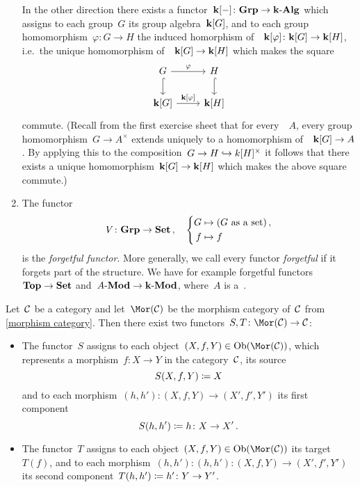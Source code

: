 \begin{example}
\begin{enumerate}
      In the other direction there exists a functor~$\mathbf{k}[-] \colon \mathbf{Grp} \to \text{$\mathbf{k}$-$\mathbf{Alg}$}$ which assigns to each group~$G$ its group algebra~$\mathbf{k}[G]$, and to each group homomorphism~$\varphi \colon G \to H$ the induced homorphism of~{\kalgs}~$\mathbf{k}[\varphi] \colon \mathbf{k}[G] \to \mathbf{k}[H]$, i.e.\ the unique homomorphism of~{\kalgs}~$\mathbf{k}[G] \to \mathbf{k}[H]$ which makes the square
      \[
        \begin{tikzcd}
            G
            \arrow{r}[above]{\varphi}
            \arrow[hook]{d}
          & H
            \arrow[hook]{d}
          \\
            \kf[G]
            \arrow{r}[above]{\kf[\varphi]}
          & \kf[H]
        \end{tikzcd}
      \]
      commute.
      (Recall from the first exercise sheet that for every~{\kalg}~$A$, every group homomorphism~$G \to A^\times$ extends uniquely to a homomorphism of~{\kalgs}~$\mathbf{k}[G] \to A$.
      By applying this to the composition~$G \to H \hookrightarrow k[H]^\times$ it follows that there exists a unique homomorphism~$\mathbf{k}[G] \to \mathbf{k}[H]$ which makes the above square commute.)
    \item
      The functor
      \[
                V
        \colon  \mathbf{Grp}
        \to     \mathbf{Set} \,,
        \quad   \left\{
                  \begin{aligned}
                              G
                    &\mapsto  (\text{$G$ as a set}) \,,
                    \\
                              f
                    &\mapsto  f
                  \end{aligned}
                \right.
      \]
      is the \emph{forgetful functor}.
      More generally, we call every functor \emph{forgetful} if it forgets part of the structure.
      We have for example forgetful functors~$\mathbf{Top} \to \mathbf{Set}$ and~$\text{$A$-$\mathbf{Mod}$} \to \text{$\mathbf{k}$-$\mathbf{Mod}$}$, where~$A$ is a~{\kalg}.
  \end{enumerate}
\end{example}


\begin{example*}
  \label{source target functors}
  Let~$\mathcal{C}$ be a category and let~$\Mor(\Ccat)$ be the morphism category of~$\mathcal{C}$ from \cref{morphism category}.
  Then there exist two functors~$S, T \colon \Mor(\Ccat) \to \Ccat$:
  \begin{itemize}
    \item
      The functor~$S$ assigns to each object~$(X,f,Y) \in \Ob(\Mor(\Ccat))$, which represents a morphism~$f \colon X \to Y$ in the category~$\mathcal{C}$, its source
      \[
                  S(X,f,Y)
        \coloneqq  X
      \]
      and to each morphism~$(h,h') \colon (X,f,Y) \to (X',f',Y')$ its first component
      \[
                  S(h,h')
        \coloneqq  h \colon X \to X' \,.
      \]
    \item
      The functor~$T$ assigns to each object~$(X,f,Y) \in \Ob(\Mor(\Ccat))$ its target~$T(f)$, and to each morphism~$(h,h') \colon (h,h') \colon (X,f,Y) \to (X',f',Y')$ its second component~$T(h,h') \coloneqq h' \colon Y \to Y'$.
  \end{itemize}
\end{example*}


